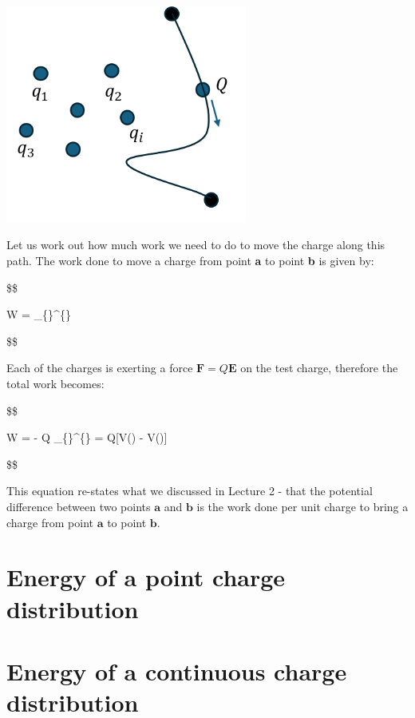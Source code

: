 \documentclass[
  letterpaper,
  DIV=11,
  numbers=noendperiod]{scrreprt}
\begin{document}
\includegraphics[width=3.125in,height=\textheight]{Figures/workdone_charge.png}

Let us work out how much work we need to do to move the charge along
this path. The work done to move a charge from point \textbf{a} to point
\textbf{b} is given by:

\$\$

W = \int\_\{\}\^{}\{\}
 \cdot {}  

\$\$

Each of the charges is exerting a force
\(\mathrm{\mathbf{F}}= Q \mathrm{\mathbf{E}}\) on the test charge,
therefore the total work becomes:

\$\$

W = - Q \int\_\{\}\^{}\{\}
 \cdot {}  =
Q{[}V() - V(){]}

\$\$

This equation re-states what we discussed in Lecture 2 - that the
potential difference between two points \(\mathrm{\mathbf{a}}\) and
\(\mathrm{\mathbf{b}}\) is the work done per unit charge to bring a
charge from point \(\mathrm{\mathbf{a}}\) to point
\(\mathrm{\mathbf{b}}\).

\section{Energy of a point charge
distribution}\label{energy-of-a-point-charge-distribution}

\section{Energy of a continuous charge
distribution}\label{energy-of-a-continuous-charge-distribution}
\end{document}
